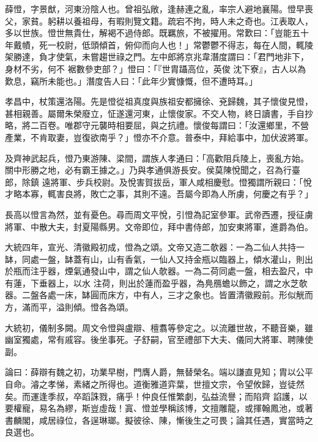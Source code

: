 \begin{pinyinscope}
薛憕，字景猷，河東汾陰人也。曾祖弘敞，逢赫連之亂，率宗人避地襄陽。憕早喪父，家貧。躬耕以養祖母，有暇則覽文籍。疏宕不拘，時人未之奇也。江表取人，多以世族。憕世無貴仕，解褐不過侍郎。既羈旅，不被擢用。常歎曰：「豈能五十年戴幘，死一校尉，低頭傾首，俯仰而向人也！」常鬱鬱不得志，每在人間，輒陵架勝達，負才使氣，未嘗趨世祿之門。左中郎將京兆韋潛度謂曰：「君門地非下，身材不劣，何不
 裾數參吏部？」憕曰：「『世胄躡高位，英俊
 沈下寮』，古人以為歎息，竊所未能也。」潛度告人曰：「此年少實慷慨，但不遭時耳。」



 孝昌中，杖策還洛陽。先是憕從祖真度與族祖安都擁徐、兗歸魏，其子懷俊見憕，甚相親善。屬爾朱榮廢立，怔遂還河東，止懷俊家。不交人物，終日讀書，手自抄略，將二百卷。唯郡守元襲時相要屈，與之抗禮。懷俊每謂曰：「汝還鄉里，不營產業，不肯取妻，豈復欲南乎？」憕亦不介意。普泰中，拜給事中，加伏波將軍。



 及齊神武起兵，憕乃東游陳、梁間，謂族人孝通曰：「高歡阻兵陵上，喪亂方始。關中形勝之地，必有霸王據之。」乃與孝通俱游長安。侯莫陳悅聞之，召為行臺郎，除鎮
 遠將軍、步兵校尉。及悅害賀拔岳，軍人咸相慶慰。憕獨謂所親曰：「悅才略本寡，輒害良將，敗亡之事，其則不遠。吾屬今即為人所虜，何慶之有乎？」



 長高以憕言為然，並有憂色。尋而周文平悅，引憕為記室參軍。武帝西遷，授征虜將軍、中散大夫，封夏陽縣男。文帝即位，拜中書侍郎，加安東將軍，進爵為伯。



 大統四年，宣光、清徽殿初成，憕為之頌。文帝又造二欹器：一為二仙人共持一缽，同處一盤，缽蓋有山，山有香氣，一仙人又持金瓶以臨器上，傾水灌山，則出於瓶而注乎器，煙氣通發山中，謂之仙人欹器。一為二荷同處一盤，相去盈尺，中有蓮，下垂器上，以水
 注荷，則出於蓮而盈乎器，為鳧鴈蟾以飾之，謂之水芝欹器。二盤各處一床，缽圓而床方，中有人，三才之象也。皆置清徽殿前。形似觥而方，滿而平，溢則傾。憕各為頌。



 大統初，儀制多闕。周文令憕與盧辯、檀翥等參定之。以流離世故，不聽音樂，雖幽室獨處，常有戚容。後坐事死。子舒嗣，官至禮部下大夫、儀同大將軍、聘陳使副。



 論曰：薛辯有魏之初，功業早樹，門膺人爵，無替榮名。端以謙直見知；胄以公平自命。濬之孝悌，素緒之所得也。道衡雅道弈葉，世擅文宗，令望攸歸，豈徒然矣。而運逢季叔，卒蹈誅戮，痛乎！仲良任惟繁劇，弘益流譽；而陷齊
 諂護，以要權寵，易名為繆，斯豈虛哉！寘、憕並學稱該博，文擅雕龍，或揮翰鳳池，或著書麟閣，咸居祿位，各逞琳瑯。擬彼徐、陳，慚後生之可畏；論其任遇，實當時之良選也。



\end{pinyinscope}
